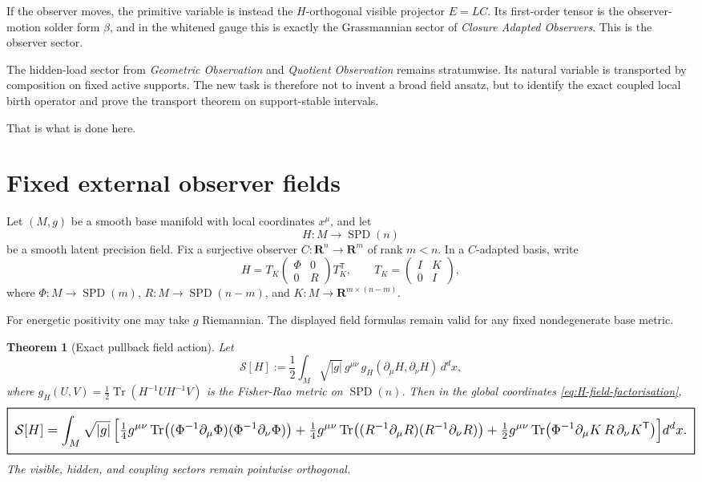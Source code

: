\documentclass[11pt,a4paper]{article}
\numberwithin{equation}{section}
\DeclareMathOperator{\Tr}{Tr}
\DeclareMathOperator{\SPD}{SPD}
\newcommand{\R}{\mathbf R}
\newcommand{\geomboxed}[1]{%
  \setlength{\fboxsep}{8pt}%
  \setlength{\fboxrule}{0.9pt}%
  \fbox{\scalebox{1.5}{$\displaystyle #1$}}%
}
\theoremstyle{thmcompact}
\newtheorem{theorem}{Theorem}[section]
\theoremstyle{remark}
\begin{document}
If the observer moves, the primitive variable is instead the $H$-orthogonal visible projector $E=LC$. Its first-order tensor is the observer-motion solder form $\beta$, and in the whitened gauge this is exactly the Grassmannian sector of \emph{Closure Adapted Observers}. This is the observer sector.

The hidden-load sector from \emph{Geometric Observation} and \emph{Quotient Observation} remains stratumwise. Its natural variable is transported by composition on fixed active supports. The new task is therefore not to invent a broad field ansatz, but to identify the exact coupled local birth operator and prove the transport theorem on support-stable intervals.

That is what is done here.

\section{Fixed external observer fields}

Let $(M,g)$ be a smooth base manifold with local coordinates $x^\mu$, and let
\[
H:M\to\SPD(n)
\]
be a smooth latent precision field. Fix a surjective observer $C:\R^n\to\R^m$ of rank $m<n$. In a $C$-adapted basis, write
\begin{equation}
H=T_K
\begin{pmatrix}
\Phi & 0\\
0 & R
\end{pmatrix}
T_K^{\mathsf T},
\qquad
T_K=
\begin{pmatrix}
I & K\\
0 & I
\end{pmatrix},
\label{eq:H-field-factorisation}
\end{equation}
where $\Phi:M\to\SPD(m)$, $R:M\to\SPD(n-m)$, and $K:M\to\R^{m\times(n-m)}$.

For energetic positivity one may take $g$ Riemannian. The displayed field formulas remain valid for any fixed nondegenerate base metric.

\begin{theorem}[Exact pullback field action]
\label{thm:field-action}
Let
\begin{equation}
\mathcal S[H]
:=
\frac12\int_M \sqrt{|g|}\, g^{\mu\nu}\, g_H(\partial_\mu H,\partial_\nu H)
\,d^dx,
\label{eq:field-action-def}
\end{equation}
where $g_H(U,V)=\tfrac12\Tr(H^{-1}UH^{-1}V)$ is the Fisher-Rao metric on $\SPD(n)$. Then in the global coordinates \eqref{eq:H-field-factorisation},
\begin{equation}
\geomboxed{
\mathcal S[H]
=
\int_M \sqrt{|g|}\,\Bigl[
\tfrac14 g^{\mu\nu}\Tr\bigl((\Phi^{-1}\partial_\mu\Phi)(\Phi^{-1}\partial_\nu\Phi)\bigr)
+
\tfrac14 g^{\mu\nu}\Tr\bigl((R^{-1}\partial_\mu R)(R^{-1}\partial_\nu R)\bigr)
+
\tfrac12 g^{\mu\nu}\Tr\bigl(\Phi^{-1}\partial_\mu K\,R\,\partial_\nu K^{\mathsf T}\bigr)
\Bigr] d^dx.
}
\label{eq:exact-field-split}
\end{equation}
The visible, hidden, and coupling sectors remain pointwise orthogonal.
\end{theorem}
\end{document}
